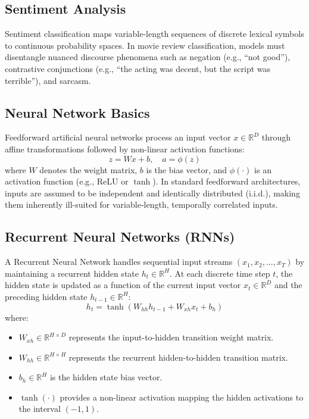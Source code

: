 \documentclass[11pt,a4paper]{article}
\begin{document}
\subsection{Sentiment Analysis}
Sentiment classification maps variable-length sequences of discrete lexical symbols to continuous probability spaces. In movie review classification, models must disentangle nuanced discourse phenomena such as negation (e.g., ``not good''), contrastive conjunctions (e.g., ``the acting was decent, but the script was terrible''), and sarcasm.

\subsection{Neural Network Basics}
Feedforward artificial neural networks process an input vector $x \in \mathbb{R}^D$ through affine transformations followed by non-linear activation functions:
\begin{equation}
z = Wx + b, \quad a = \phi(z)
\end{equation}
where $W$ denotes the weight matrix, $b$ is the bias vector, and $\phi(\cdot)$ is an activation function (e.g., ReLU or $\tanh$). In standard feedforward architectures, inputs are assumed to be independent and identically distributed (i.i.d.), making them inherently ill-suited for variable-length, temporally correlated inputs.

\subsection{Recurrent Neural Networks (RNNs)}
A Recurrent Neural Network handles sequential input streams $(x_1, x_2, \dots, x_T)$ by maintaining a recurrent hidden state $h_t \in \mathbb{R}^H$. At each discrete time step $t$, the hidden state is updated as a function of the current input vector $x_t \in \mathbb{R}^D$ and the preceding hidden state $h_{t-1} \in \mathbb{R}^H$:
\begin{equation}
h_t = \tanh(W_{hh} h_{t-1} + W_{xh} x_t + b_h)
\label{eq:rnn_hidden}
\end{equation}
where:
\begin{itemize}
    \item $W_{xh} \in \mathbb{R}^{H \times D}$ represents the input-to-hidden transition weight matrix.
    \item $W_{hh} \in \mathbb{R}^{H \times H}$ represents the recurrent hidden-to-hidden transition matrix.
    \item $b_h \in \mathbb{R}^H$ is the hidden state bias vector.
    \item $\tanh(\cdot)$ provides a non-linear activation mapping the hidden activations to the interval $(-1, 1)$.
\end{itemize}
\end{document}
